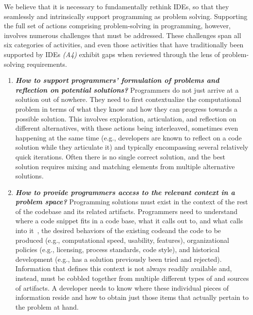We believe that it is necessary to fundamentally rethink IDEs, so that they seamlessly and intrinsically
support programming as problem solving. Supporting the full set of actions comprising problem-solving
in programming, however, involves numerous challenges that must be addressed. These challenges span
all six categories of activities, and even those activities that have traditionally been supported by IDEs \textit{(A4)} exhibit gaps when reviewed through the lens of problem-solving requirements.

\begin{enumerate}
	\item \textit{\textbf{How to support programmers' formulation of problems and reflection on potential solutions?}}
	Programmers do not just arrive at a solution out of nowhere.
	They need to first contextualize the computational problem in terms of what they know and how they can progress towards a possible solution.
	This involves exploration, articulation, and reflection on different alternatives, with these actions being interleaved, sometimes even happening at the same time (e.g., developers are known to reflect on a code solution while they articulate it) and typically encompassing several relatively quick iterations.
	Often there is no single correct solution, and the best solution requires mixing and matching elements from multiple alternative solutions.
    
    \item \textit{\textbf{How to provide programmers access to the relevant context in a problem space?}}
    Programming solutions must exist in the context of the rest of the codebase and its related artifacts.
    Programmers need to understand where a code snippet fits in a code base, what it calls out to, and what calls into it~\cite{desouza2008empirical}, the desired behaviors of the existing codeand the code to be produced (e.g., computational speed, usability, features), organizational policies (e.g., licensing, process standards, code style), and historical development (e.g., has a solution previously been tried and rejected).
    Information that defines this context is not always readily available and, instead, must be cobbled together from multiple different types of and sources of artifacts.
    A developer needs to know where these individual pieces of information reside and how to obtain just those items that actually pertain to the problem at hand.
    

\end{enumerate}
